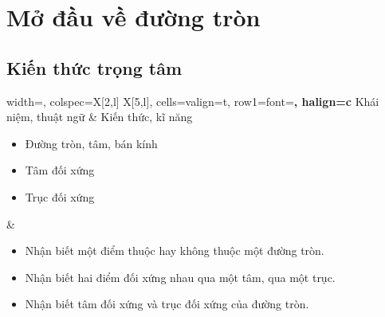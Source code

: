 %

\section{Mở đầu về đường tròn}

\begin{lesson}
    \subsection{Kiến thức trọng tâm}

    \begin{center}
    \begin{tblr}{
        width=\linewidth,
        colspec={X[2,l] X[5,l]},
        cells={valign=t},
        row{1}={font=\bfseries, halign=c}
    }
        Khái niệm, thuật ngữ & Kiến thức, kĩ năng \\
        \begin{minipage}[t]{\linewidth}
        \begin{itemize}
            \item Đường tròn, tâm, bán kính
            \item Tâm đối xứng
            \item Trục đối xứng
        \end{itemize}
        \end{minipage}
        &
        \begin{minipage}[t]{\linewidth}
        \begin{itemize}
            \item Nhận biết một điểm thuộc hay không thuộc một đường tròn.
            \item Nhận biết hai điểm đối xứng nhau qua một tâm, qua một trục.
            \item Nhận biết tâm đối xứng và trục đối xứng của đường tròn.
        \end{itemize}
        \end{minipage}
    \end{tblr}
    \end{center}


\end{lesson}
